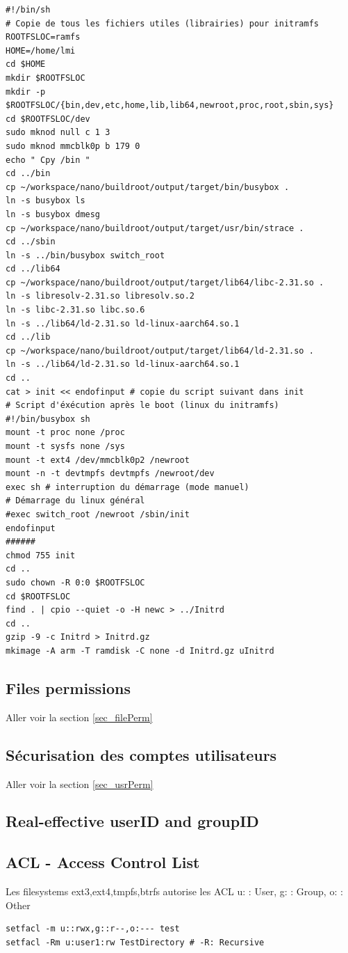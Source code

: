 \documentclass[resume]{subfiles}
\begin{document}
\begin{lstlisting}[style=bash,label={lst:init_ramfs},caption={}]
#!/bin/sh
# Copie de tous les fichiers utiles (librairies) pour initramfs
ROOTFSLOC=ramfs
HOME=/home/lmi
cd $HOME
mkdir $ROOTFSLOC
mkdir -p $ROOTFSLOC/{bin,dev,etc,home,lib,lib64,newroot,proc,root,sbin,sys}
cd $ROOTFSLOC/dev
sudo mknod null c 1 3
sudo mknod mmcblk0p b 179 0
echo " Cpy /bin "
cd ../bin
cp ~/workspace/nano/buildroot/output/target/bin/busybox .
ln -s busybox ls
ln -s busybox dmesg
cp ~/workspace/nano/buildroot/output/target/usr/bin/strace .
cd ../sbin
ln -s ../bin/busybox switch_root
cd ../lib64
cp ~/workspace/nano/buildroot/output/target/lib64/libc-2.31.so .
ln -s libresolv-2.31.so libresolv.so.2
ln -s libc-2.31.so libc.so.6
ln -s ../lib64/ld-2.31.so ld-linux-aarch64.so.1
cd ../lib
cp ~/workspace/nano/buildroot/output/target/lib64/ld-2.31.so .
ln -s ../lib64/ld-2.31.so ld-linux-aarch64.so.1
cd ..
cat > init << endofinput # copie du script suivant dans init
# Script d'éxécution après le boot (linux du initramfs)
#!/bin/busybox sh
mount -t proc none /proc
mount -t sysfs none /sys
mount -t ext4 /dev/mmcblk0p2 /newroot
mount -n -t devtmpfs devtmpfs /newroot/dev
exec sh # interruption du démarrage (mode manuel)
# Démarrage du linux général
#exec switch_root /newroot /sbin/init 
endofinput
######
chmod 755 init
cd ..
sudo chown -R 0:0 $ROOTFSLOC
cd $ROOTFSLOC
find . | cpio --quiet -o -H newc > ../Initrd
cd ..
gzip -9 -c Initrd > Initrd.gz
mkimage -A arm -T ramdisk -C none -d Initrd.gz uInitrd
\end{lstlisting}

\subsection{Files permissions}
Aller voir la section \ref{sec_filePerm}

\subsection{Sécurisation des comptes utilisateurs}
Aller voir la section \ref{sec_usrPerm}

\subsection{Real-effective userID and groupID}

\subsection{ACL - Access Control List}
Les filesystems ext3,ext4,tmpfs,btrfs autorise les ACL
u: : User, g: : Group, o: : Other
\begin{lstlisting}[style=bash]
setfacl -m u::rwx,g::r--,o:--- test
setfacl -Rm u:user1:rw TestDirectory # -R: Recursive
\end{lstlisting}
\end{document}
